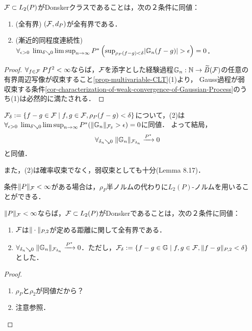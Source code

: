 \documentclass[uplatex,dvipdfmx]{jsreport}
\begin{document}
\begin{corollary}[Donskerクラスであることの特徴付け１]\label{cor-characterization-of-Donsker-classes-1}
    $\mathcal{F}\subset L_2(P)$がDonskerクラスであることは，次の２条件に同値：
    \begin{enumerate}
        \item (全有界) $(\mathcal{F},d_P)$が全有界である．
        \item (漸近的同程度連続性) $\forall_{\epsilon>0}\;\lim_{\delta\searrow 0}\limsup_{n\to\infty} P^*\left(\sup_{\rho_P(f-g)<\delta}\lvert\mathbb{G}_n(f-g)\rvert>\epsilon\right)=0$．
    \end{enumerate}
\end{corollary}
\begin{proof}
    $\forall_{f\in\mathcal{F}}\;Pf^2<\infty$ならば，$\mathcal{F}$を添字とした経験過程$\mathbb{G}_n:\mathbb{N}\to\widetilde{B}(\mathcal{F})$の任意の有界周辺写像が収束すること\ref{prop-multivariable-CLT}(1)より，
    Gauss過程が弱収束する条件\ref{cor-characterization-of-weak-convergence-of-Gaussian-Process}のうち(1)は必然的に満たされる．
\end{proof}
\begin{remark}[漸近的同程度連続性の特徴付け]
    $\mathcal{F}_\delta:=\left\{f-g\in\mathcal{F}\mid f,g\in\mathcal{F},\rho_P(f-g)<\delta\right\}$について，(2)は
    $\forall_{\epsilon>0}\;\lim_{\delta\searrow0}\limsup_{n\to\infty}P^*(\|\mathbb{G}_n\|_{\mathcal{F}_\delta}>\epsilon)=0$に同値．
    よって結局，
    \[\forall_{\delta_n\searrow 0}\;\|\mathbb{G}_n\|_{\mathcal{F}_{\delta_n}}\xrightarrow{P^*}0\]
    と同値．

    また，(2)は確率収束でなく，弱収束としても十分\cite{Kosorok}(Lemma 8.17)．
\end{remark}

条件$\|P\|_{\mathcal{F}}<\infty$がある場合は，$\rho_P$半ノルムの代わりに$L_2(P)$-ノルムを用いることができる．

\begin{corollary}\label{cor-characterization-of-Donsker-classes-2}
    $\|P\|_{\mathcal{F}}<\infty$ならば，$\mathcal{F}\subset L_2(P)$がDonskerであることは，次の２条件に同値：
    \begin{enumerate}
        \item $\mathcal{F}$は$\|\cdot\|_{P,2}$が定める距離に関して全有界である．
        \item $\forall_{\delta_n\searrow 0}\;\|\mathbb{G}_n\|_{\mathcal{F}_{\delta_n}}\xrightarrow{P^*}0$．ただし，$\mathcal{F}_\delta:=\left\{f-g\in\mathbb{G}\mid f,g\in\mathcal{F},\|f-g\|_{P,2}<\delta\right\}$とした．
    \end{enumerate}
\end{corollary}
\begin{proof}\mbox{}
    \begin{enumerate}
        \item $\rho_P$と$\rho_2$が同値だから？
        \item 注意参照．
    \end{enumerate}
\end{proof}
\end{document}
